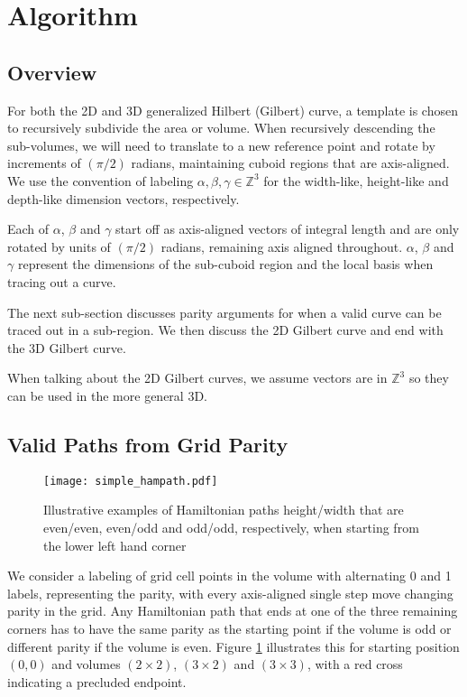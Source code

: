 \section{Algorithm}

\subsection{Overview}

For both the 2D and 3D generalized Hilbert (Gilbert) curve, a template is chosen
to recursively subdivide the area or volume.
When recursively descending the sub-volumes, we will need to translate to
a new reference point and rotate by increments of $(\pi/2)$ radians, maintaining
cuboid regions that are axis-aligned.
We use the convention of labeling $\alpha, \beta, \gamma \in \mathbb{Z}^3$ for
the width-like, height-like and depth-like dimension vectors, respectively.

Each of $\alpha$, $\beta$ and $\gamma$ start off as axis-aligned vectors of integral
length and are only rotated by units of $(\pi/2)$ radians, remaining axis aligned throughout.
$\alpha$, $\beta$ and $\gamma$ represent the dimensions of the sub-cuboid region
and the local basis when tracing out a curve.

The next sub-section discusses parity arguments for when a valid curve can be
traced out in a sub-region.
We then discuss the 2D Gilbert curve and end with the 3D Gilbert curve.

When talking about the 2D Gilbert curves, we assume vectors are in $\mathbb{Z}^3$
so they can be used in the more general 3D.


\subsection{Valid Paths from Grid Parity}

\begin{figure}[h]
  \centering
  \texttt{[image: simple\_hampath.pdf]}
  \caption{ Illustrative examples of Hamiltonian paths height/width that are even/even, even/odd and odd/odd, respectively,
            when starting from the lower left hand corner }
  \label{fig:exampleHampath}
\end{figure}

We consider a labeling of grid cell points in the volume with alternating 0 and 1 labels, representing the parity,
with every axis-aligned single step move changing parity in the grid.
Any Hamiltonian path that ends at one of the three remaining corners has to have the same parity as the starting point if the
volume is odd or different parity if the volume is even.
Figure \ref{fig:exampleHampath} illustrates this for starting position $(0,0)$ and volumes $(2 \times 2)$, $(3 \times 2)$ and $(3 \times 3)$,
with a red cross indicating a precluded endpoint.


